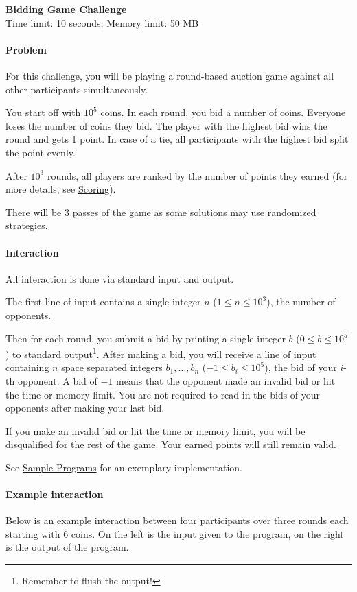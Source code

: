 \documentclass[
    a4paper,
    12pt,
    parskip=half,
    headings=standardclasses,
    footskip=0pt,
    footlines=1,
    headheight=80in
]{scrartcl}
\begin{document}
\begin{center}
    {\LARGE\textbf{Bidding Game Challenge}}\\[6pt]
    Time limit: 10 seconds, Memory limit: 50 MB
\end{center}

\paragraph*{Problem}

For this challenge, you will be playing a round-based auction game against all
other participants simultaneously.

You start off with $10^5$ coins. In each round, you bid a number of coins. Everyone loses the number of coins they bid.
The player with the highest bid wins the round and gets 1 point. In case of a tie, all participants with the highest bid
split the point evenly.

After $10^3$ rounds, all players are ranked by the
number of points they earned (for more details, see \hyperref[scoring]{Scoring}).

There will be 3 passes of the game as some solutions may use
randomized strategies.

\paragraph*{Interaction} All interaction is done via standard input and output.

The first line of input contains a single integer $n$ ($1 \leq n \leq 10^3$),
the number of opponents.

Then for each round, you submit a bid by printing a single integer $b$ ($0 \leq
    b \leq 10^5$) to standard output\footnote{Remember to flush the output!}. After
making a bid, you will receive a line of input containing $n$ space separated
integers $b_1, \ldots, b_n$ ($-1 \leq b_i \leq 10^5$), the bid of your $i$-th
opponent. A bid of $-1$ means that the opponent made an invalid bid or hit the
time or memory limit. You are not required to read in the bids of your opponents after
making your last bid.

If you make an invalid bid or hit the time or memory limit, you will be
disqualified for the rest of the game. Your earned points will still remain valid.

See \hyperref[sample-programs]{Sample Programs} for an exemplary implementation.

\paragraph*{Example interaction} Below is an example interaction between four participants over three rounds
each starting with $6$ coins. On the left is the input given to the program, on the right is the output of the program.
\end{document}
